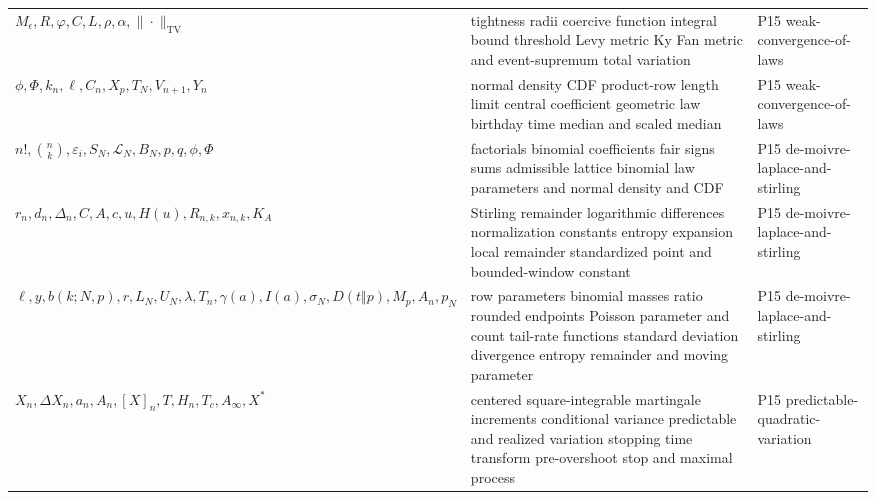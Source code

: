 \begin{longtable}{@{}p{}p{}p{}@{}}
\(M_\epsilon,\allowbreak R,\allowbreak \varphi,\allowbreak C,\allowbreak L,\allowbreak \rho,\allowbreak \alpha,\allowbreak \|\cdot\|_{\mathrm{TV}}\) & tightness radii coercive function integral bound threshold Levy metric Ky Fan metric and event-supremum total variation & P15 weak-\allowbreak{}convergence-\allowbreak{}of-\allowbreak{}laws \\
\(\phi,\allowbreak \Phi,\allowbreak k_n,\allowbreak \ell,\allowbreak C_n,\allowbreak X_p,\allowbreak T_N,\allowbreak V_{n+1},\allowbreak Y_n\) & normal density CDF product-row length limit central coefficient geometric law birthday time median and scaled median & P15 weak-\allowbreak{}convergence-\allowbreak{}of-\allowbreak{}laws \\
\(n!,\allowbreak \binom nk,\allowbreak \varepsilon_i,\allowbreak S_N,\allowbreak \mathcal L_N,\allowbreak B_N,\allowbreak p,\allowbreak q,\allowbreak \phi,\allowbreak \Phi\) & factorials binomial coefficients fair signs sums admissible lattice binomial law parameters and normal density and CDF & P15 de-\allowbreak{}moivre-\allowbreak{}laplace-\allowbreak{}and-\allowbreak{}stirling \\
\(r_n,\allowbreak d_n,\allowbreak \Delta_n,\allowbreak C,\allowbreak A,\allowbreak c,\allowbreak u,\allowbreak H(u),\allowbreak R_{n,k},\allowbreak x_{n,k},\allowbreak K_A\) & Stirling remainder logarithmic differences normalization constants entropy expansion local remainder standardized point and bounded-window constant & P15 de-\allowbreak{}moivre-\allowbreak{}laplace-\allowbreak{}and-\allowbreak{}stirling \\
\(\ell,\allowbreak y,\allowbreak b(k;\allowbreak N,\allowbreak p),\allowbreak r,\allowbreak L_N,\allowbreak U_N,\allowbreak \lambda,\allowbreak T_n,\allowbreak \gamma(a),\allowbreak I(a),\allowbreak \sigma_N,\allowbreak D(t\Vert p),\allowbreak M_p,\allowbreak A_n,\allowbreak p_N\) & row parameters binomial masses ratio rounded endpoints Poisson parameter and count tail-rate functions standard deviation divergence entropy remainder and moving parameter & P15 de-\allowbreak{}moivre-\allowbreak{}laplace-\allowbreak{}and-\allowbreak{}stirling \\
\(X_n,\allowbreak \Delta X_n,\allowbreak a_n,\allowbreak A_n,\allowbreak [X]_n,\allowbreak T,\allowbreak H_n,\allowbreak T_c,\allowbreak A_\infty,\allowbreak X^*\) & centered square-integrable martingale increments conditional variance predictable and realized variation stopping time transform pre-overshoot stop and maximal process & P15 predictable-\allowbreak{}quadratic-\allowbreak{}variation \\

\end{longtable}
